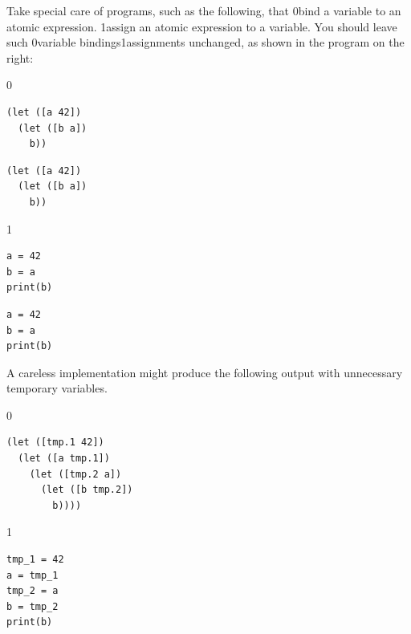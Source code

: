 \documentclass[7x10]{TimesAPriori_MIT}%
\def\racketEd{0}
\def\pythonEd{1}
\providecommand{\BookEdition}{1}
\let\edition\BookEdition
\newcommand{\racket}[1]{{\if\edition\racketEd{#1}\fi}}
\newcommand{\pythonColor}[0]{}
\newcommand{\python}[1]{{\if\edition\pythonEd\pythonColor #1\fi}}
\numberwithin{theorem}{chapter}
\numberwithin{definition}{chapter}
\numberwithin{equation}{chapter}
\begin{document}
Take special care of programs, such as the following, that
%
\racket{bind a variable to an atomic expression.}
%
\python{assign an atomic expression to a variable.}
%
You should leave such \racket{variable bindings}\python{assignments}
unchanged, as shown in the program on the right:\\
%
{\if\edition\racketEd
\begin{transformation}
\begin{lstlisting}
(let ([a 42])
  (let ([b a])
    b))
\end{lstlisting}
\compilesto
\begin{lstlisting}
(let ([a 42])
  (let ([b a])
    b))
\end{lstlisting}
\end{transformation}
\fi}
{\if\edition\pythonEd\pythonColor
\begin{transformation}
\begin{lstlisting}
a = 42
b = a
print(b)
\end{lstlisting}
\compilesto
\begin{lstlisting}
a = 42
b = a
print(b)
\end{lstlisting}
\end{transformation}
\fi}
%
\noindent A careless implementation might produce the following output with
unnecessary temporary variables.
\begin{center}
\begin{minipage}{0.4\textwidth}
{\if\edition\racketEd
\begin{lstlisting}
(let ([tmp.1 42])
  (let ([a tmp.1])
    (let ([tmp.2 a])
      (let ([b tmp.2])
        b))))
\end{lstlisting}
\fi}
{\if\edition\pythonEd\pythonColor
\begin{lstlisting}
tmp_1 = 42
a = tmp_1
tmp_2 = a
b = tmp_2
print(b)
\end{lstlisting}
\fi}
\end{minipage}
\end{center}
\end{document}

